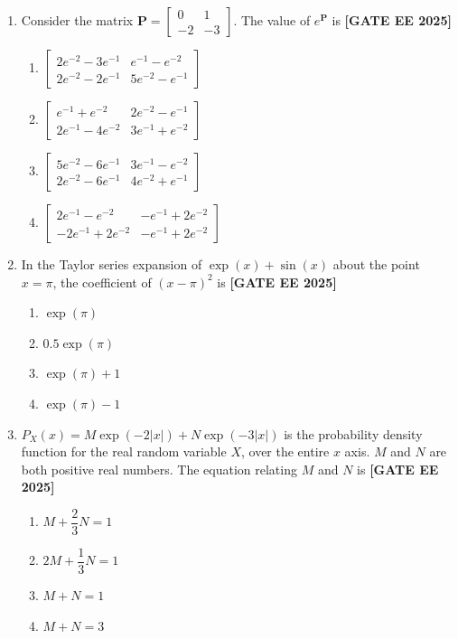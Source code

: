 \documentclass[12pt,a4paper]{article}
\begin{document}
\begin{enumerate}[leftmargin=*, label=\textbf{Q.\arabic*:}]
\item Consider the matrix $\mathbf{P} = \begin{bmatrix} 0 & 1 \\ -2 & -3 \end{bmatrix}$. The value of $e^{\mathbf{P}}$ is
\newline
\noindent \textbf{[GATE EE 2025]}
\begin{enumerate}[label=(\Alph*)]
    \item $\begin{bmatrix} 2e^{-2} - 3e^{-1} & e^{-1} - e^{-2} \\ 2e^{-2} - 2e^{-1} & 5e^{-2} - e^{-1}\end{bmatrix}$
    \item $\begin{bmatrix} e^{-1} + e^{-2} & 2e^{-2} - e^{-1} \\ 2e^{-1} - 4e^{-2} & 3e^{-1} + e^{-2} \end{bmatrix}$
    \item $\begin{bmatrix} 5e^{-2} - 6e^{-1} & 3e^{-1} - e^{-2} \\ 2e^{-2} - 6e^{-1} & 4e^{-2} + e^{-1} \end{bmatrix}$
    \item $\begin{bmatrix} 2e^{-1} - e^{-2} & -e^{-1} + 2e^{-2} \\ -2e^{-1} + 2e^{-2} & -e^{-1} + 2e^{-2} \end{bmatrix}$
\end{enumerate}

\item In the Taylor series expansion of $\exp(x) + \sin(x)$ about the point $x = \pi$, the coefficient of $(x - \pi)^2$ is
\newline
\noindent \textbf{[GATE EE 2025]}
\begin{enumerate}[label=(\Alph*)]
    \item $\exp(\pi)$
    \item $0.5 \exp(\pi)$
    \item $\exp(\pi) + 1$
    \item $\exp(\pi) - 1$
\end{enumerate}

\item $P_X(x) = M\exp(-2|x|) + N\exp(-3|x|)$ is the probability density function for the real random variable $X$, over the entire $x$ axis. $M$ and $N$ are both positive real numbers. The equation relating $M$ and $N$ is
\newline
\noindent \textbf{[GATE EE 2025]}
\begin{enumerate}[label=(\Alph*)]
    \item $M + \dfrac{2}{3} N = 1$
    \item $2M + \dfrac{1}{3}N = 1$
    \item $M + N = 1$
    \item $M + N = 3$
\end{enumerate}


\end{enumerate}
\end{document}
